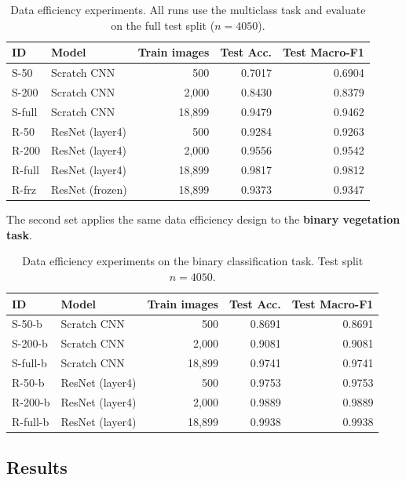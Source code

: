 \begin{table}[H]
\centering
\caption{Data efficiency experiments. All runs use the multiclass task and
evaluate on the full test split ($n=4050$).}
\label{tab:data_efficiency_exp}
\begin{tabular}{llrrr}
\toprule
ID & Model & Train images & Test Acc. & Test Macro-F1 \\
\midrule
S-50    & Scratch CNN       &    500 & 0.7017 & 0.6904 \\
S-200   & Scratch CNN       &  2{,}000 & 0.8430 & 0.8379 \\
S-full  & Scratch CNN       & 18{,}899 & 0.9479 & 0.9462 \\
\midrule
R-50    & ResNet (layer4)   &    500 & 0.9284 & 0.9263 \\
R-200   & ResNet (layer4)   &  2{,}000 & 0.9556 & 0.9542 \\
R-full  & ResNet (layer4)   & 18{,}899 & 0.9817 & 0.9812 \\
\midrule
R-frz   & ResNet (frozen)   & 18{,}899 & 0.9373 & 0.9347 \\
\bottomrule
\end{tabular}
\end{table}

The second set applies the same data efficiency design to the \textbf{binary
vegetation task}.

\begin{table}[H]
\centering
\caption{Data efficiency experiments on the binary classification task.
Test split $n=4050$.}
\label{tab:data_efficiency_binary}
\begin{tabular}{llrrr}
\toprule
ID & Model & Train images & Test Acc. & Test Macro-F1 \\
\midrule
S-50-b   & Scratch CNN     &    500 & 0.8691 & 0.8691 \\
S-200-b  & Scratch CNN     &  2{,}000 & 0.9081 & 0.9081 \\
S-full-b & Scratch CNN     & 18{,}899 & 0.9741 & 0.9741 \\
\midrule
R-50-b   & ResNet (layer4) &    500 & 0.9753 & 0.9753 \\
R-200-b  & ResNet (layer4) &  2{,}000 & 0.9889 & 0.9889 \\
R-full-b & ResNet (layer4) & 18{,}899 & 0.9938 & 0.9938 \\
\bottomrule
\end{tabular}
\end{table}

\subsection{Results}

